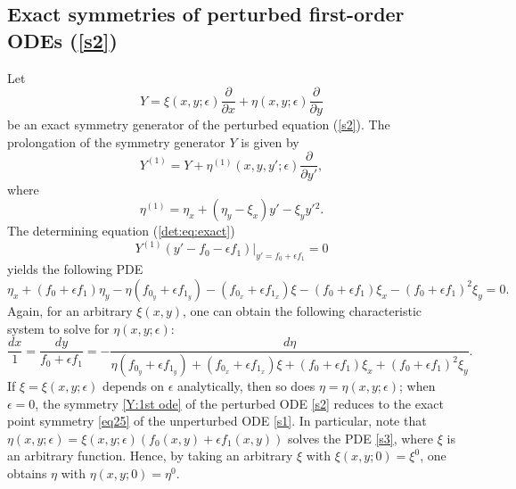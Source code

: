 \documentclass[11pt,letter,subeqn]{article}
\begin{document}
\subsection{Exact symmetries of perturbed first-order ODEs (\ref{s2})}
 Let
 \begin{equation}\label{Y:1st ode}
   Y=\xi(x,y;\epsilon)\dfrac{\partial}{\partial x}+ \eta(x,y;\epsilon) \dfrac{\partial}{\partial y}
 \end{equation}
 be an exact symmetry generator of the perturbed equation (\ref{s2}). The prolongation of the symmetry generator $Y$ is given by
 \[
   Y^{(1)}=Y+\eta^{(1)}(x,y,y';\epsilon)\dfrac{\partial}{\partial y'},
 \]
  where
 \[
  \eta^{(1)}=\eta_x+(\eta_y-\xi_x)y'-\xi_{y}y'{^2}.
 \]
 The determining equation (\ref{det:eq:exact})
 \[
    Y^{{(1)}}(y'-f_0-\epsilon f_1)\bigg|_{y'=f_0+\epsilon f_1}=0
 \]
 yields the following PDE
 \begin{equation}\label{s3}
  \eta_x+(f_{0}+\epsilon f_{1})\eta_y-\eta(f_{0_y}+\epsilon f_{1_y}) -(f_{0_x}+\epsilon f_{1_x})\xi-(f_{0}+\epsilon f_{1})\xi_x-(f_{0}+\epsilon f_{1})^2\xi_y=0.
 \end{equation}
Again, for an arbitrary $\xi(x,y)$, one can obtain the following characteristic system to solve for $\eta(x,y;\epsilon)$:
 \begin{equation}\label{b2}
    \dfrac{dx}{1}=\dfrac{dy}{f_{0}+\epsilon f_{1}}=-\dfrac{d \eta}{\eta(f_{0_y}+\epsilon f_{1_y}) +(f_{0_x}+\epsilon f_{1_x})\xi+(f_{0}+\epsilon f_{1})\xi_x+(f_{0}+\epsilon
    f_{1})^2\xi_y}.
  \end{equation}
  If $\xi=\xi(x,y;\epsilon)$ depends on $\epsilon$ analytically, then so does $\eta=\eta(x,y;\epsilon)$; when $\epsilon=0$, the symmetry \eqref{Y:1st ode} of the perturbed ODE \eqref{s2} reduces to the exact point symmetry \eqref{eq25} of the unperturbed ODE \eqref{s1}. In particular, note that $\eta(x,y;\epsilon)=\xi(x,y;\epsilon)(f_{0}(x,y)+\epsilon f_{1}(x,y))$ solves the PDE \eqref{s3}, where $\xi$ is an arbitrary function. Hence, by taking an arbitrary $\xi$ with $\xi(x,y;0)=\xi^0$, one obtains $\eta$ with $\eta(x,y;0)=\eta^0$.
\end{document}
